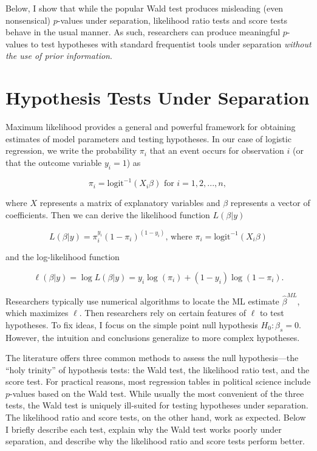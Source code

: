 \documentclass[
]{article}
\begin{document}
Below, I show that while the popular Wald test produces misleading (even
nonsensical) \(p\)-values under separation, likelihood ratio tests and
score tests behave in the usual manner. As such, researchers can produce
meaningful \(p\)-values to test hypotheses with standard frequentist
tools under separation \emph{without the use of prior information}.

\hypertarget{hypothesis-tests-under-separation}{%
\section{Hypothesis Tests Under
Separation}\label{hypothesis-tests-under-separation}}

Maximum likelihood provides a general and powerful framework for
obtaining estimates of model parameters and testing hypotheses. In our
case of logistic regression, we write the probability \(\pi_i\) that an
event occurs for observation \(i\) (or that the outcome variable
\(y_i = 1\)) as

\begin{equation}
\pi_i = \text{logit}^{-1}(X_i\beta)\text{ for } i = 1, 2, ... , n \text{, }
\end{equation}

\noindent where \(X\) represents a matrix of explanatory variables and
\(\beta\) represents a vector of coefficients. Then we can derive the
likelihood function \(L(\beta | y)\)

\begin{equation}
L(\beta | y) = \pi_{i}^{y_i}(1 - \pi_{i})^{(1 - y_i)}\text{,  where } \pi_i = \text{logit}^{-1}(X_i\beta)
\end{equation}

\noindent and the log-likelihood function

\begin{equation}
\ell(\beta | y) = \log L(\beta | y) = y_i \log(\pi_{i}) + (1 - y_i) \log(1 - \pi_{i}).
\end{equation}

\noindent Researchers typically use numerical algorithms to locate the
ML estimate \(\hat{\beta}^{ML}\), which maximizes \(\ell\). Then
researchers rely on certain features of \(\ell\) to test hypotheses. To
fix ideas, I focus on the simple point null hypothesis
\(H_0: \beta_s = 0\). However, the intuition and conclusions generalize
to more complex hypotheses.

The literature offers three common methods to assess the null
hypothesis---the ``holy trinity'' of hypothesis tests: the Wald test,
the likelihood ratio test, and the score test. For practical reasons,
most regression tables in political science include \(p\)-values based
on the Wald test. While usually the most convenient of the three tests,
the Wald test is uniquely ill-suited for testing hypotheses under
separation. The likelihood ratio and score tests, on the other hand,
work as expected. Below I briefly describe each test, explain why the
Wald test works poorly under separation, and describe why the likelihood
ratio and score tests perform better.
\end{document}
